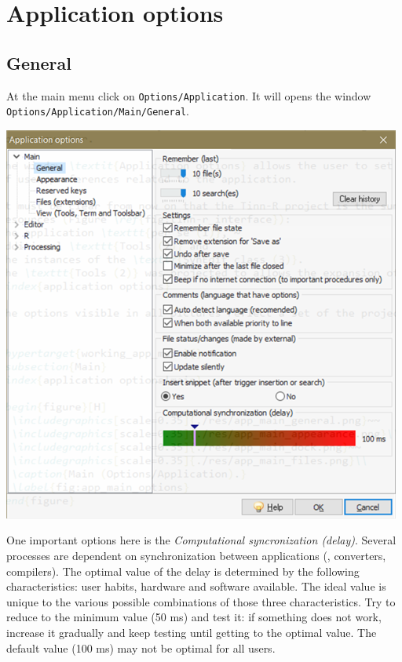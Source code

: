 
\section{Application options}
\subsection{General}

At the main menu click on \texttt{Options/Application}.
It will opens the window \texttt{Options/Application/Main/General}.

\vspace{5mm}
\includegraphics[scale=0.8]{./res/app_main_general.png}\\
\vspace{5mm}

One important options here is the \textit{Computational syncronization (delay)}.
Several processes are dependent on synchronization between applications
(\RR{}, converters, compilers). The optimal value of the delay is determined by the following characteristics:
user habits, hardware and software available.
The ideal value is unique to the various possible combinations of those three characteristics.
Try to reduce to the minimum value (50 ms) and test it: if something does not work, increase it gradually
and keep testing until getting to the optimal value. The default value (100 ms) may not be optimal for all users.


